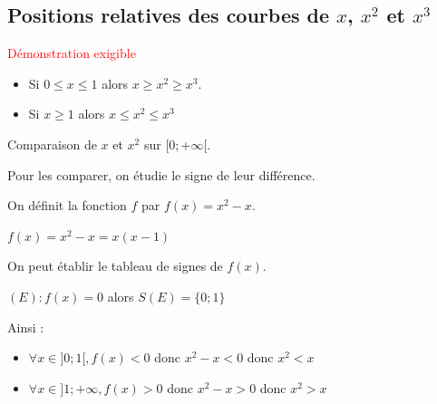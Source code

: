 \begin{pageCours}
\begin{minipage}{0.48\linewidth}
\end{minipage}

\section{{Positions relatives des courbes de $x$, $x^2$ et $x^3$}}

\begin{Pp}
\textcolor{red}{Démonstration exigible}

\begin{itemize}
\item Si $0\leq x \leq 1$ alors $x\geq x^2 \geq x^3$.
\item Si $x\geq 1$ alors $x\leq x^2 \leq x^3$
\end{itemize}

\end{Pp}

\begin{Pv}
Comparaison de $x$ et $x^2$ sur $[0;+\infty[$.

Pour les comparer, on étudie le signe de leur différence.

On définit la fonction $f$ par $f(x)=x^2-x$.

$f(x)=x^2-x=x(x-1)$

On peut établir le tableau de signes de $f(x)$.

$(E):f(x)=0$ alors $S(E)=\{0;1\}$\vspace{.2cm}


Ainsi :
\begin{itemize}
\item $\forall x \in ]0;1[,f(x)<0$ donc $x^2-x<0$ donc $x^2<x$
\item $\forall x \in ]1;+\infty,f(x)>0$ donc $x^2-x>0$ donc $x^2>x$
\end{itemize}
\end{Pv}


\end{pageCours}
